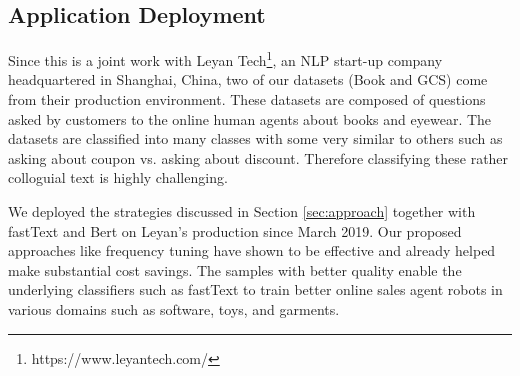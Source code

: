 

\subsection{Application Deployment}
Since this is a joint work with Leyan Tech\footnote{https://www.leyantech.com/}, an NLP start-up company 
headquartered in Shanghai, China, two of our datasets (Book and GCS) come 
from their production environment. These datasets are composed of questions 
asked by customers to the online human agents about books and eyewear. 
The datasets are classified into many classes with some very similar to 
others such as asking about coupon vs. asking about discount. Therefore
classifying these rather colloguial text is highly challenging.

We deployed the strategies discussed in Section \ref{sec:approach} 
together with fastText and Bert on Leyan's
production since March 2019. Our proposed approaches like frequency tuning 
have shown to be effective and already helped make substantial cost savings. 
The samples with better quality enable the underlying classifiers 
such as fastText to train better online sales agent robots 
in various domains such as software, toys, and garments.
